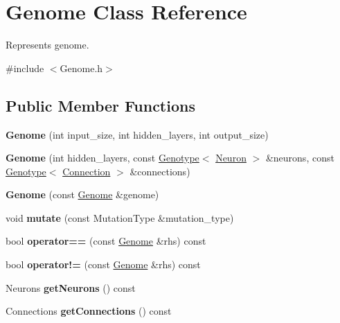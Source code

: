 \hypertarget{classGenome}{}\section{Genome Class Reference}
\label{classGenome}


Represents genome.  




{\ttfamily \#include $<$Genome.\+h$>$}

\subsection*{Public Member Functions}
\begin{DoxyCompactItemize}
\item 
{\bfseries Genome} (int input\+\_\+size, int hidden\+\_\+layers, int output\+\_\+size)\hypertarget{classGenome_a08f0bdfc91c960226de4a76824efa9f8}{}\label{classGenome_a08f0bdfc91c960226de4a76824efa9f8}

\item 
{\bfseries Genome} (int hidden\+\_\+layers, const \hyperlink{classGenotype}{Genotype}$<$ \hyperlink{classNeuron}{Neuron} $>$ \&neurons, const \hyperlink{classGenotype}{Genotype}$<$ \hyperlink{classConnection}{Connection} $>$ \&connections)\hypertarget{classGenome_a43feb27690888ba31de0cd0e182ae68b}{}\label{classGenome_a43feb27690888ba31de0cd0e182ae68b}

\item 
{\bfseries Genome} (const \hyperlink{classGenome}{Genome} \&genome)\hypertarget{classGenome_aff7ee3f037c64e4764f6ea8e035e076e}{}\label{classGenome_aff7ee3f037c64e4764f6ea8e035e076e}

\item 
void {\bfseries mutate} (const Mutation\+Type \&mutation\+\_\+type)\hypertarget{classGenome_ae5a44d1b9b981207c3c035111773d67f}{}\label{classGenome_ae5a44d1b9b981207c3c035111773d67f}

\item 
bool {\bfseries operator==} (const \hyperlink{classGenome}{Genome} \&rhs) const \hypertarget{classGenome_a5c04453dc59ba5d5bc7d9b82982ae89c}{}\label{classGenome_a5c04453dc59ba5d5bc7d9b82982ae89c}

\item 
bool {\bfseries operator!=} (const \hyperlink{classGenome}{Genome} \&rhs) const \hypertarget{classGenome_a4c60caa54530ddb4e4fee035c0958254}{}\label{classGenome_a4c60caa54530ddb4e4fee035c0958254}

\item 
Neurons {\bfseries get\+Neurons} () const \hypertarget{classGenome_af7e210105ebaaca5f74fd35354aca4a9}{}\label{classGenome_af7e210105ebaaca5f74fd35354aca4a9}

\item 
Connections {\bfseries get\+Connections} () const \hypertarget{classGenome_a08affdae441734b35cfaf36221d7e9da}{}\label{classGenome_a08affdae441734b35cfaf36221d7e9da}

\end{DoxyCompactItemize}
